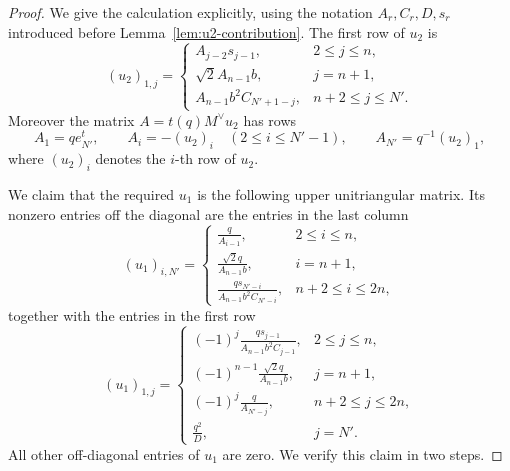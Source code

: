 \begin{proof}
We give the calculation explicitly, using the notation \(A_r,C_r,D,s_r\) introduced before Lemma~\ref{lem:u2-contribution}.
The first row of \(u_2\) is
\[
(u_2)_{1,j}=
\begin{cases}
A_{j-2}s_{j-1}, & 2\le j\le n,\\[0.4em]
\sqrt2A_{n-1}b, & j=n+1,\\[0.4em]
A_{n-1}b^2C_{N'+1-j}, & n+2\le j\le N'.
\end{cases}
\]
Moreover the matrix \(A=t(q)M^\vee u_2\) has rows
\[
A_1=q e_{N'}^t,
\qquad
A_i=-(u_2)_i\quad(2\le i\le N'-1),
\qquad
A_{N'}=q^{-1}(u_2)_1,
\]
where \((u_2)_i\) denotes the \(i\)-th row of \(u_2\).

We claim that the required \(u_1\) is the following upper unitriangular matrix. Its nonzero entries off the diagonal are the entries in the last column
\[
(u_1)_{i,N'}=
\begin{cases}
\displaystyle \frac{q}{A_{i-1}}, & 2\le i\le n,\\[1.1em]
\displaystyle \frac{\sqrt2q}{A_{n-1}b}, & i=n+1,\\[1.1em]
\displaystyle \frac{q s_{N'-i}}{A_{n-1}b^2C_{N'-i}}, & n+2\le i\le 2n,
\end{cases}
\]
together with the entries in the first row
\[
(u_1)_{1,j}=
\begin{cases}
\displaystyle (-1)^j\frac{q s_{j-1}}{A_{n-1}b^2C_{j-1}}, & 2\le j\le n,\\[1.1em]
\displaystyle (-1)^{n-1}\frac{\sqrt2q}{A_{n-1}b}, & j=n+1,\\[1.1em]
\displaystyle (-1)^j\frac{q}{A_{N'-j}}, & n+2\le j\le 2n,\\[1.1em]
\displaystyle \frac{q^2}{D}, & j=N'.
\end{cases}
\]
All other off-diagonal entries of \(u_1\) are zero. We verify this claim in two steps.


\end{proof}
